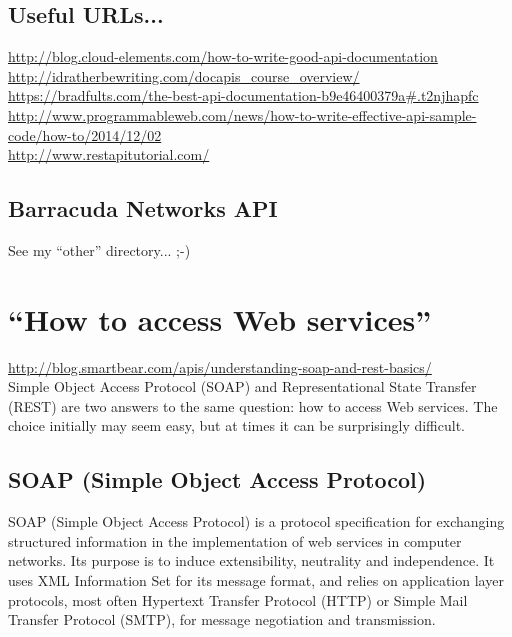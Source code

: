\documentclass[11pt]{article}
\begin{document}
\subsection{Useful URLs...}
\href{http://blog.cloud-elements.com/how-to-write-good-api-documentation}{http://blog.cloud-elements.com/how-to-write-good-api-documentation}\\
\href{http://idratherbewriting.com/docapis_course_overview/}{http://idratherbewriting.com/docapis\_course\_overview/}\\
\href{https://bradfults.com/the-best-api-documentation-b9e46400379a#.b04jcz2ox}{https://bradfults.com/the-best-api-documentation-b9e46400379a\#.t2njhapfc}\\
\href{http://www.programmableweb.com/news/how-to-write-effective-api-sample-code/how-to/2014/12/02}{http://www.programmableweb.com/news/how-to-write-effective-api-sample-code/how-to/2014/12/02}\\
\href{http://www.restapitutorial.com/}{http://www.restapitutorial.com/}\\

\subsection{Barracuda Networks API}
See my ``other'' directory... ;-)



\newpage
\section{``How to access Web services''}
\href{http://blog.smartbear.com/apis/understanding-soap-and-rest-basics/}{http://blog.smartbear.com/apis/understanding-soap-and-rest-basics/}\\
Simple Object Access Protocol (SOAP) and Representational State Transfer (REST) are two answers to the same question: how to access Web services. The choice initially may seem easy, but at times it can be surprisingly difficult.

\subsection{SOAP (Simple Object Access Protocol)} 
SOAP (Simple Object Access Protocol) is a protocol specification for
exchanging structured information in the implementation of web
services in computer networks. Its purpose is to induce extensibility,
neutrality and independence. It uses XML Information Set for its
message format, and relies on application layer protocols, most often
Hypertext Transfer Protocol (HTTP) or Simple Mail Transfer Protocol
(SMTP), for message negotiation and transmission.
\end{document}

